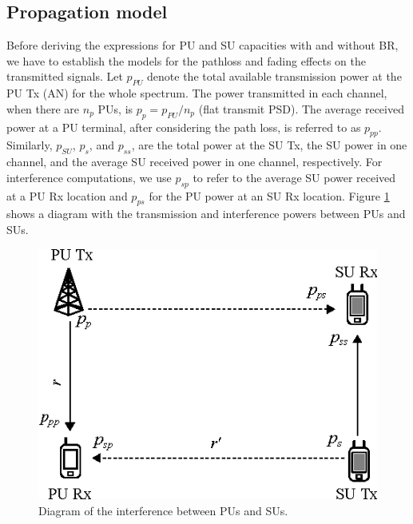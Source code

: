\subsection{Propagation model}
Before deriving the expressions for PU and SU capacities with and without BR, we have to establish the models for the pathloss and fading effects on the transmitted signals. Let $p_{PU}$ denote the total available transmission power at the PU Tx (AN) for the whole spectrum. The power transmitted in each channel, when there are $n_{p}$ PUs, is $p_{p}=p_{PU}/n_{p}$ (flat transmit PSD). The average received power at a PU terminal, after considering the path loss, is referred to as $p_{pp}$. Similarly, $p_{SU}$, $p_{s}$, and $p_{ss}$, are the total power at the SU Tx, the SU power in one channel, and the average SU received power in one channel, respectively. For interference computations, we use $p_{sp}$ to refer to the average SU power received at a PU Rx location and $p_{ps}$ for the PU power at an SU Rx location. Figure \ref{BR_fig_interference} shows a diagram with the transmission and interference powers between PUs and SUs.

\begin{figure}[ht]
\centering
\includegraphics[scale=1]{interference.eps}
\caption[]{Diagram of the interference between PUs and SUs.}\label{BR_fig_interference}
\end{figure} 

